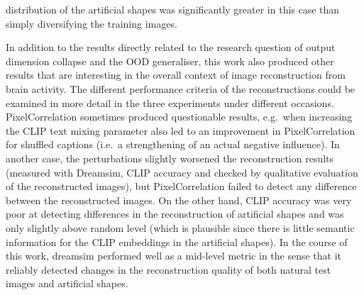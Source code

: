 distribution of the artificial shapes was significantly greater in this case than simply diversifying the training images.

In addition to the results directly related to the research question of output dimension collapse and the OOD generaliser, this work also produced other results that are interesting in the overall context of image reconstruction from brain activity. The different performance criteria of the reconstructions could be examined in more detail in the three experiments under different occasions. PixelCorrelation sometimes produced questionable results, e.g.\ when increasing the CLIP text mixing parameter also led to an improvement in PixelCorrelation for shuffled captions (i.e.\ a strengthening of an actual negative influence). In another case, the perturbations slightly worsened the reconstruction results (measured with Dreamsim, CLIP accuracy and checked by qualitative evaluation of the reconstructed images), but PixelCorrelation failed to detect any difference between the reconstructed images. On the other hand, CLIP accuracy was very poor at detecting differences in the reconstruction of artificial shapes and was only slightly above random level (which is plausible since there is little semantic information for the CLIP embeddings in the artificial shapes). In the course of this work, dreamsim performed well as a mid-level metric in the sense that it reliably detected changes in the reconstruction quality of both natural test images and artificial shapes.

